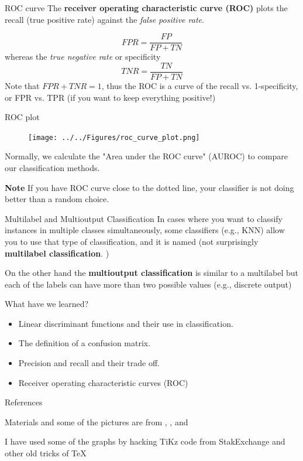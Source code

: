 \documentclass{beamer}
\begin{document}
\begin{frame}{ROC curve}
	The {\bf receiver operating characteristic curve (ROC)} plots the recall (true positive rate) against the {\it false positive rate}. 
	
	\begin{equation*}
		FPR= \frac{FP}{FP+TN}
	\end{equation*}
whereas the {\it true negative rate} or specificity 
\begin{equation*}
	TNR= \frac{TN}{FP+TN}
\end{equation*}
	Note that $FPR+TNR=1$, thus the ROC is a curve of the recall vs. 1-specificity, or FPR vs. TPR (if you want to keep everything positive!)
\end{frame}
\begin{frame}{ROC plot}
\begin{figure}
	\centering
	\texttt{[image: ../../Figures/roc\_curve\_plot.png]}
\end{figure}
Normally, we calculate the "Area under the ROC curve" (AUROC) to compare our classification methods.

{\bf Note} If you have ROC curve close to the dotted line, your classifier is not doing better than a random choice.
\end{frame}
\begin{frame}{Multilabel and Multioutput Classification}
	In cases where you want to classify instances in multiple classes simultaneously, some classifiers (e.g., KNN) allow you to use that type of classification, and it is named (not surprisingly {\bf multilabel classification}. )
	
	On the other hand the {\bf multioutput classification} is similar to a multilabel but each of the labels can have more than two possible values (e.g., discrete output)
\end{frame}

\begin{frame}{What have we learned?}
	\begin{itemize}
		\item Linear discriminant functions and their use in classification.
		\item The definition of a confusion matrix.
		\item Precision and recall and their trade off. 
		\item Receiver operating characteristic curves (ROC)

		
	\end{itemize}
\end{frame}


\begin{frame}{References}
	

Materials and some of the pictures are from \citep{James2015}, \citep{duda}, and \citep{geron2}
\printbibliography 

	
	I have used some of the graphs by hacking TiKz code from StakExchange and other old tricks of \TeX
\end{frame}		
\end{document}
